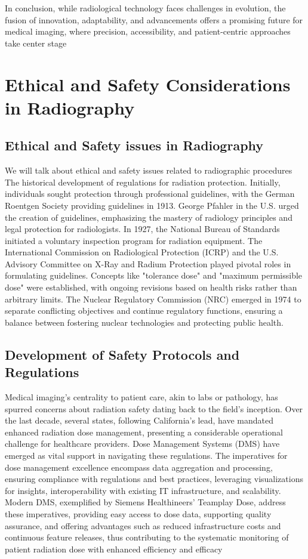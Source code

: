 \documentclass[a4paper,12pt]{report}
\begin{document}
In conclusion, while radiological technology faces challenges in evolution, the fusion of
innovation, adaptability, and advancements offers a promising future for medical imaging, where
precision, accessibility, and patient-centric approaches take center stage

\chapter{Ethical and Safety Considerations in Radiography}

\section{Ethical and Safety issues in Radiography}
We will talk about ethical and safety issues related to radiographic procedures\\

The historical development of regulations for radiation protection. Initially, individuals sought
protection through professional guidelines, with the German Roentgen Society providing
guidelines in 1913. George Pfahler in the U.S. urged the creation of guidelines, emphasizing the
mastery of radiology principles and legal protection for radiologists. In 1927, the National Bureau
of Standards initiated a voluntary inspection program for radiation equipment. The International
Commission on Radiological Protection (ICRP) and the U.S. Advisory Committee on X-Ray and
Radium Protection played pivotal roles in formulating guidelines. Concepts like "tolerance dose"
and "maximum permissible dose" were established, with ongoing revisions based on health risks
rather than arbitrary limits. The Nuclear Regulatory Commission (NRC) emerged in 1974 to
separate conflicting objectives and continue regulatory functions, ensuring a balance between
fostering nuclear technologies and protecting public health.

\section{Development of Safety Protocols and Regulations}

Medical imaging's centrality to patient care, akin to labs or pathology, has spurred concerns about
radiation safety dating back to the field's inception. Over the last decade, several states, following
California's lead, have mandated enhanced radiation dose management, presenting a considerable
operational challenge for healthcare providers. Dose Management Systems (DMS) have emerged
as vital support in navigating these regulations. The imperatives for dose management excellence
encompass data aggregation and processing, ensuring compliance with regulations and best
practices, leveraging visualizations for insights, interoperability with existing IT infrastructure,
and scalability. Modern DMS, exemplified by Siemens Healthineers' Teamplay Dose, address
these imperatives, providing easy access to dose data, supporting quality assurance, and offering
advantages such as reduced infrastructure costs and continuous feature releases, thus contributing
to the systematic monitoring of patient radiation dose with enhanced efficiency and efficacy
\end{document}
